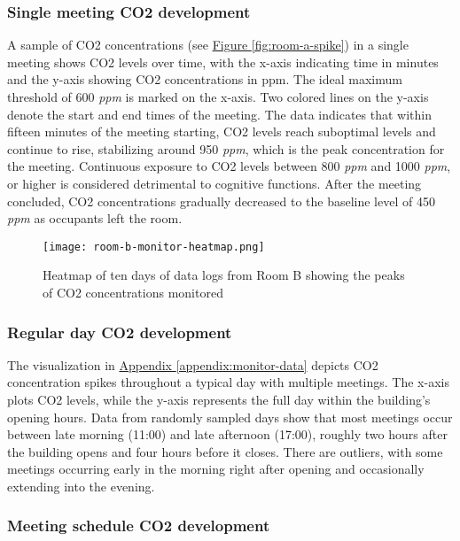 \subsubsection{Single meeting CO2 development}

A sample of CO2 concentrations (see \hyperref[fig:room-a-spike]{Figure \ref*{fig:room-a-spike}}) in a single meeting shows CO2 levels over time, with the x-axis indicating time in minutes and the y-axis showing CO2 concentrations in ppm. The ideal maximum threshold of 600 \textit{ppm} is marked on the x-axis. Two colored lines on the y-axis denote the start and end times of the meeting. The data indicates that within fifteen minutes of the meeting starting, CO2 levels reach suboptimal levels and continue to rise, stabilizing around 950 \textit{ppm}, which is the peak concentration for the meeting. Continuous exposure to CO2 levels between 800 \textit{ppm} and 1000 \textit{ppm}, or higher is considered detrimental to cognitive functions. After the meeting
concluded, CO2 concentrations gradually decreased to the baseline
level of 450 \textit{ppm} as occupants left the room.

\begin{figure}[h]
    \centering
    \texttt{[image: room-b-monitor-heatmap.png]}
    \caption{Heatmap of ten days of data logs from Room B showing the peaks of CO2 concentrations monitored }
    \label{fig:room-b-heatmap-chart}
\end{figure}

\subsubsection{Regular day CO2 development}

The visualization in \hyperref[appendix:monitor-data]{Appendix \ref*{appendix:monitor-data}} depicts CO2 concentration spikes throughout a typical day with multiple meetings. The x-axis plots CO2 levels, while the y-axis represents the full day within the building’s opening hours. Data from randomly sampled days show that most meetings occur between late morning (11:00) and late afternoon (17:00), roughly two hours after the building opens and four hours before it closes. There are outliers, with some meetings occurring early in the morning right after opening and occasionally extending into the evening.

\subsubsection{Meeting schedule CO2 development}

